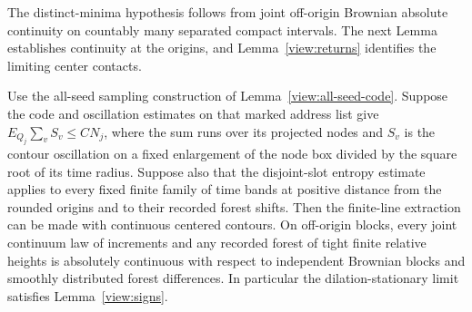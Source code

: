 The distinct-minima hypothesis follows from joint off-origin Brownian
absolute continuity on countably many separated compact intervals.
The next Lemma establishes continuity at the origins, and
Lemma~\ref{view:returns} identifies the limiting center contacts.

\begin{lemma}\label{view:origin-continuity}
Use the all-seed sampling construction of Lemma~\ref{view:all-seed-code}.
Suppose the code and oscillation estimates on that marked address list give
$E_{Q_j}\sum_v S_v\le C N_j$, where the sum runs over its projected
nodes and $S_v$ is the contour oscillation on a fixed enlargement of the
node box divided by the square root of its time radius.  Suppose also
that the disjoint-slot entropy estimate applies to every fixed finite
family of time bands at positive distance from the rounded origins and
to their recorded forest shifts.  Then the finite-line extraction can
be made with continuous centered contours.  On off-origin blocks,
every joint continuum law of increments and any recorded forest of
tight finite relative heights is absolutely continuous with respect
to independent Brownian blocks and smoothly distributed forest
differences.  In particular the
dilation-stationary limit satisfies Lemma~\ref{view:signs}.
\end{lemma}


